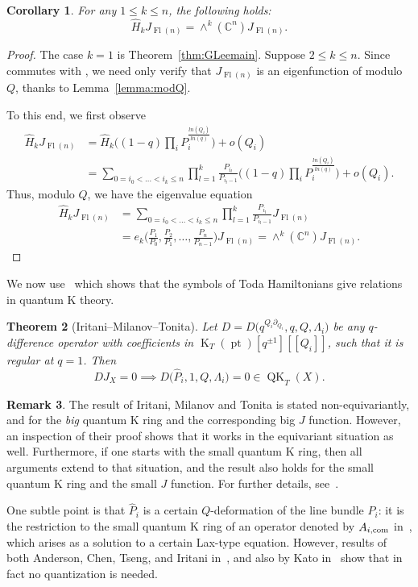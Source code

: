 \documentclass[pdftex]{sigma}
\numberwithin{equation}{section}
\newtheorem{Theorem}{Theorem}[section]
\newtheorem{Corollary}[Theorem]{Corollary}
\theoremstyle{definition}
\newtheorem{Remark}[Theorem]{Remark}
\DeclareMathOperator{\Fl}{Fl}
\DeclareMathOperator{\QK}{QK}
\DeclareMathOperator{\K}{K}
\DeclareMathOperator{\pt}{pt}
\begin{document}
\begin{Corollary}\label{cor:Hk-eigenval} For any $1 \le k \le n$, the following holds:
\[ \widehat{H}_kJ_{\Fl(n)}=\wedge^k(\mathbb{C}^n) J_{\Fl(n)} . \]
\end{Corollary}
\begin{proof} The case $k=1$ is Theorem~\ref{thm:GLeemain}. Suppose $2 \le k \le n$. Since  commutes with , we need only verify that $J_{\Fl(n)}$ is an eigenfunction of  modulo $Q$, thanks to Lemma~\ref{lemma:modQ}.

To this end, we first observe
\begin{align*}
\widehat{H}_k J_{\Fl(n)}&{}=\widehat{H}_k\biggl((1-q)\prod_i P_i^{\frac{ln(Q_i)}{ln(q)}}\biggr) + o(Q_i) \\
&{}=
\sum_{0= i_0<\dots<i_k\leq n}\prod_{l=1}^k \frac{P_{i_l}}{P_{i_l-1}}\biggl((1-q)\prod_i P_i^{\frac{ln(Q_i)}{ln(q)}}\biggr)+o(Q_i) .
\end{align*}
Thus, modulo $Q$, we have the eigenvalue equation
\begin{align*}
\widehat{H}_k J_{\Fl(n)}&{}=\sum_{0= i_0<\dots<i_k\leq n}
\prod_{l=1}^k \frac{P_{i_l}}{P_{i_l-1}}J_{\Fl(n)}\\
&{}=
e_k\biggl(\frac{P_1}{P_0},\frac{P_2}{P_1},\dots,\frac{P_{n}}{P_{n-1}}\biggr)J_{\Fl(n)}=\wedge^k(\mathbb{C}^n)J_{\Fl(n)} .
\tag*{\qed}
\end{align*}
\renewcommand{\qed}{}
\end{proof}

We now use~\cite[Proposition~2.12]{Iritani:2013qka} which shows that the symbols of
Toda Hamiltonians give relations in quantum K theory.

\begin{Theorem}[Iritani--Milanov--Tonita]\label{thm:IMT}
Let $D=D\bigl(q^{Q_i\partial_{Q_i}},q,Q,\Lambda_i\bigr)$ be any $q$-difference operator
with coefficients in $\K_T(\pt)[q^{\pm 1}][\![Q_i]\!]$, such that it is regular
at $q=1$. Then
\[DJ_X=0\implies D\bigl(\widehat{P}_i,1,Q,\Lambda_i\bigr)=0 \in \QK_T(X) .\]
\end{Theorem}

\begin{Remark}
The result of Iritani, Milanov and Tonita is stated non-equivariantly, and for the
{\em big} quantum K ring and the corresponding big $J$ function. However, an inspection of their proof shows that it works in the equivariant situation as well.
Furthermore, if one starts with the small quantum K ring, then all arguments extend
to that situation, and the result also holds for the small quantum K ring and the small $J$ function. For further details, see~\cite{huq2024relations}.
\end{Remark}
One subtle point is that $\widehat{P}_i$ is a certain $Q$-deformation
of the line bundle $P_i$: it is the restriction to the small
quantum K ring
of an operator denoted by
$A_{i,{\rm com}}$ in~\cite[Corollary~2.9]{Iritani:2013qka}, which
arises as a solution to a certain Lax-type equation.
However, results of both Anderson, Chen, Tseng, and Iritani
in~\cite[Lemma~6]{anderson2022finite}, and also
by Kato in~\cite[Theorem~1.35]{kato:loop}
show that in fact no quantization is needed.
\end{document}

